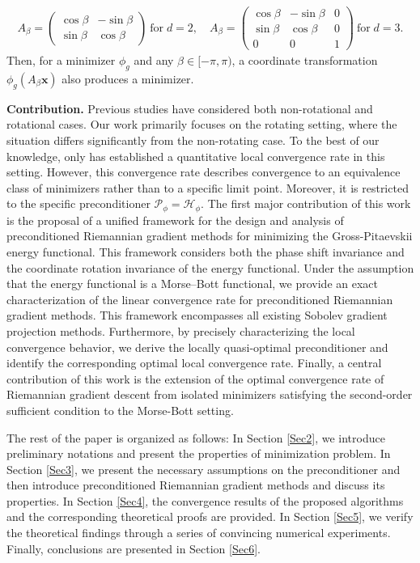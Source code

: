 \documentclass[preprint,3p]{elsarticle}
\begin{document}
\begin{align*}
	A_{\beta}=\left(\begin{matrix}
		\cos\beta &-\sin\beta\\
		\sin\beta &\cos\beta
	\end{matrix}\right)\ \text{for}\; d=2,\quad A_{\beta}=\left(\begin{matrix}
		\cos\beta &-\sin\beta &0\\
		\sin\beta & \cos\beta &0\\
		0      & 0         &1
	\end{matrix}\right)\ \text{for}\; d=3.
\end{align*}
Then, for a minimizer \(\phi_g\) and any \(\beta \in [-\pi, \pi)\), a coordinate transformation \(\phi_g(A_{\beta}\bm{x})\) also produces a minimizer. 

\textbf{Contribution.} Previous studies \cite{2024Riem,2024On,2010A,2017Computation,2020Sobolev,2023The,2024Convergence,2010Tackling,2022Exp} have considered both non-rotational and rotational cases. {Our work primarily focuses on the rotating setting, where the situation differs significantly from the non-rotating case. To the best of our knowledge, only \cite{2024Convergence} has established a quantitative local convergence rate in this setting. However, this convergence rate describes convergence to an equivalence class of minimizers rather than to a specific limit point. Moreover, it is restricted to the specific preconditioner $\mathcal{P}_\phi = \mathcal{H}_\phi$.} The first major contribution of this work is the proposal of a unified framework for the design and analysis of preconditioned Riemannian gradient methods for minimizing the Gross-Pitaevskii energy functional. This framework considers both the phase shift invariance and the coordinate rotation invariance of the energy functional. Under the assumption that the energy functional is a Morse–Bott functional, we provide an exact characterization of the linear convergence rate for preconditioned Riemannian gradient methods. This framework encompasses all existing Sobolev gradient projection methods. Furthermore, by precisely characterizing the local convergence behavior, we derive the locally quasi-optimal preconditioner and identify the corresponding optimal local convergence rate. Finally, a central contribution of this work is the extension of the optimal convergence rate of Riemannian gradient descent from isolated minimizers satisfying the second-order sufficient condition to the Morse-Bott setting.

The rest of the paper is organized as follows: In Section \ref{Sec2}, we introduce preliminary notations and present the properties of minimization problem. In Section \ref{Sec3}, we present the necessary assumptions on the preconditioner and then introduce preconditioned Riemannian gradient methods and discuss its properties. In Section \ref{Sec4}, the convergence results of the proposed algorithms and the corresponding theoretical proofs are provided. In Section \ref{Sec5}, we verify the theoretical findings through a series of convincing numerical experiments. Finally, conclusions are presented in Section \ref{Sec6}.
\end{document}
